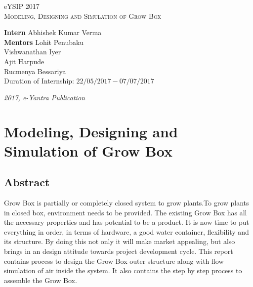 \documentclass[a4paper,12pt,oneside]{book}
\begin{document}
\begin{titlepage}
\raggedright
{\Large eYSIP 2017\\[1cm]}
{\Huge\scshape Modeling, Designing and Simulation of Grow Box \\[.1in]}
\vfill
\begin{flushright}
{\large \textbf{Intern} Abhishek Kumar Verma \\}
{\large \textbf{Mentors} \hspace{30pt} Lohit Penubaku \\}
{\large Vishwanathan Iyer \\}
{\large Ajit Harpude \\}
{\large Rucmenya Bessariya \\}
{\large Duration of Internship: $ 22/05/2017-07/07/2017 $ \\}
\end{flushright}

{\itshape 2017, e-Yantra Publication}
\end{titlepage}
 
\tableofcontents

\listoffigures

\chapter[Modeling, Designing and Simulation of Grow Box]{Modeling, Designing and Simulation of Grow Box}
\section*{Abstract}
Grow Box is partially or completely closed system to grow plants.To grow plants in closed box, environment needs to be provided. The existing Grow Box has all the necessary properties and has potential to be a product. It is now time to put everything in order, in terms of hardware, a good water container, flexibility and its structure. By doing this not only it will make market appealing, but also brings in an design attitude towards project development cycle. This report contains process to design the Grow Box outer structure along with flow simulation of air inside the system. It also contains the step by step process to assemble the Grow Box.
\end{document}

